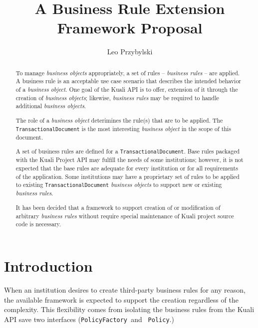 \documentclass[12pt]{article}
\title{A Business Rule Extension Framework Proposal}
\author{Leo Przybylski}
\begin{document}
  \maketitle
  \tableofcontents

  \begin{abstract}
To manage \emph{business objects} appropriately, a set of rules --
\emph{business rules} -- are applied. A business rule is an acceptable use
case scenario that describes the intended behavior of a 
\emph{business object}. One goal of the Kuali API is to offer,
extension of it through the creation of \emph{business objects}; likewise,
\emph{business rules} may be required to handle additional 
\emph{business objects}. 

The role of a \emph{business object} deterimines the rule(s) that are to be
applied. The \sf \verb|TransactionalDocument| \rm is the most interesting
\emph{business object} in the scope of this document.

A set of business rules are defined for a \sf \verb|TransactionalDocument|. \rm
Base rules packaged with the Kuali Project API may fulfill the needs of some 
institutions; however, it is not expected that the base rules are adequate for
every institution or for all requirements of the application. Some 
institutions may have a proprietary set of rules to be applied to existing
\sf \verb|TransactionalDocument| \rm \emph{business objects} to support
new or existing \emph{business rules}. 

It has been decided that a framework to support creation of or modification of
arbitrary \emph{business rules} without require special maintenance of Kuali
project source code is necessary.
  \end{abstract}
  \section{Introduction}
When an institution desires to create third-party business rules for any reason,
 the available framework is expected to support the creation regardless of the 
complexity. This flexibility comes from isolating the business rules from the 
Kuali API save two interfaces (\sf \verb|PolicyFactory |\rm and \sf 
\verb| Policy|\rm .) 
\end{document}
